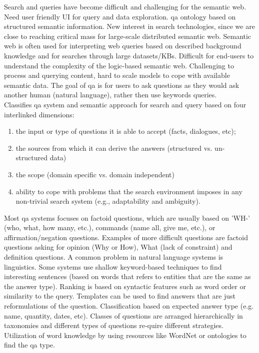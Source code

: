 Search and queries have become difficult and challenging for the semantic web. 
Need user friendly UI for query and data exploration. 
\gls{qa} ontology based on structured semantic information.
New interest in search technologies, since we are close to reaching critical mass for large-scale distributed semantic web.
Semantic web is often used for interpreting web queries based on described background knowledge and for searches through large datasets/KBs.
Difficult for end-users to understand the complexity of the logic-based semantic web. 
Challenging to process and querying content, hard to scale models to cope with available semantic data.
The goal of \gls{qa} is for users to ask questions as they would ask another human (natural language), rather then use keywords queries. \\
Classifies \gls{qa} system and semantic approach for search and query based on four interlinked dimensions: 
\begin{enumerate}
	\item the input or type of questions it is able to accept (facts, dialogues, etc);
	\item the sources from which it can derive the answers (structured vs. un-structured data)
	\item the scope (domain specific vs. domain independent)
	\item ability to cope with problems that the search environment imposes in any non-trivial search system (e.g., adaptability and ambiguity).
\end{enumerate}
Most \gls{qa} systems focuses on factoid questions, which are usually based on 'WH-' (who, what, how many, etc.), commands (name all, give me, etc.), or affirmation/negation questions. 
Examples of more difficult questions are factoid questions asking for opinion (Why or How), What (lack of constraint) and definition questions. 
A common problem in natural language systems is linguistics.
Some systems use shallow keyword-based techniques to find interesting sentences (based on words that refers to entities that are the same as the answer type). 
Ranking is based on syntactic features such as word order or similarity to the query.
Templates can be used to find answers that are just reformulations of the question.
Classification based on expected answer type (e.g. name, quantity, dates, etc).
Classes of questions are arranged hierarchically in taxonomies and different types of questions re-quire different strategies.
Utilization of word knowledge by using resources like WordNet or ontologies to find the \gls{qa} type. 
